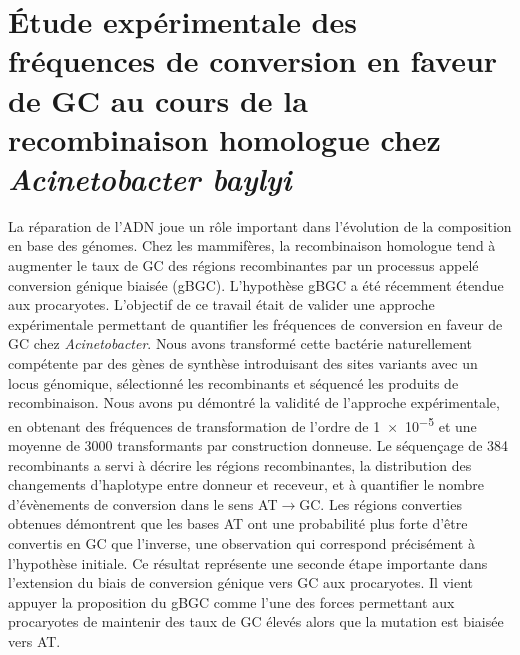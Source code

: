 

\section*{\large \centering Étude expérimentale des fréquences de conversion en faveur de GC au
  cours de la recombinaison homologue chez \emph{Acinetobacter baylyi}}
\thispagestyle{empty}

La réparation de l'ADN joue un rôle important dans l'évolution de la composition
en base des génomes. Chez les mammifères, la recombinaison homologue tend à
augmenter le taux de GC des régions recombinantes par un processus appelé
conversion génique biaisée (gBGC). L'hypothèse gBGC a été récemment étendue aux
procaryotes. L'objectif de ce travail était de valider une approche
expérimentale permettant de quantifier les fréquences de conversion en faveur de
GC chez \emph{Acinetobacter}. Nous avons transformé cette bactérie naturellement
compétente par des gènes de synthèse introduisant des sites variants avec un
locus génomique, sélectionné les recombinants et séquencé les produits de
recombinaison. Nous avons pu démontré la validité de l'approche expérimentale,
en obtenant des fréquences de transformation de l'ordre de \num{1e-5} et une
moyenne de \num{3000} transformants par construction donneuse. Le séquençage de
\num{384} recombinants a servi à décrire les régions recombinantes, la
distribution des changements d'haplotype entre donneur et receveur, et à
quantifier le nombre d'évènements de conversion dans le sens AT$\rightarrow$GC.
Les régions converties obtenues démontrent que les bases AT ont une probabilité
plus forte d'être convertis en GC que l'inverse, une observation qui correspond
précisément à l'hypothèse initiale. Ce résultat représente une seconde étape
importante dans l'extension du biais de conversion génique vers GC aux
procaryotes. Il vient appuyer la proposition du gBGC comme l'une des forces
permettant aux procaryotes de maintenir des taux de GC élevés alors que la
mutation est biaisée vers AT.

\clearpage